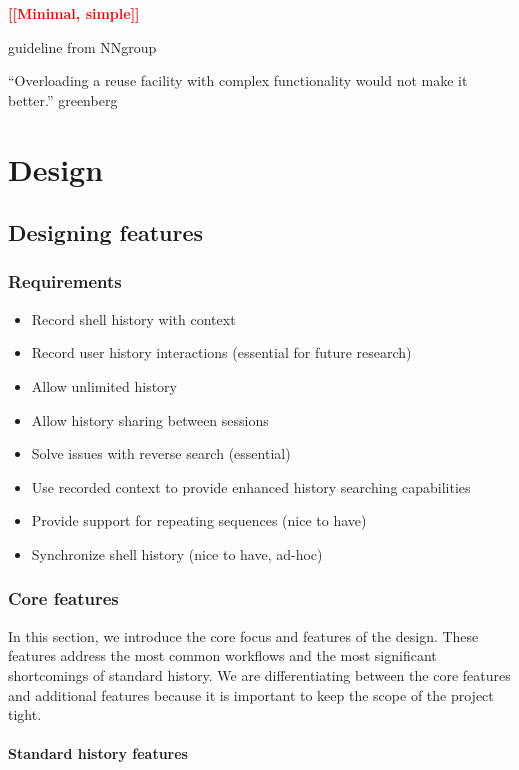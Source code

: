\documentclass[thesis=M,english]{FITthesis}[2012/10/20]
\newcommand{\todotext}[1]{\textcolor{red}{\textbf{[[#1]]}}}
\begin{document}
\todotext{Minimal, simple}

guideline from NNgroup

“Overloading a reuse facility with complex functionality would not make it better.” greenberg


\chapter{Design}

\section{Designing features}

\subsection{Requirements}

\begin{itemize}
    \item Record shell history with context
    \item Record user history interactions (essential for future research)
    \item Allow unlimited history
    \item Allow history sharing between sessions
    \item Solve issues with reverse search (essential)
    \item Use recorded context to provide enhanced history searching capabilities
    \item Provide support for repeating sequences (nice to have)
    \item Synchronize shell history (nice to have, ad-hoc)
\end{itemize}


\subsection{Core features}

In this section, we introduce the core focus and features of the design. 
These features address the most common workflows and the most significant shortcomings of standard history.
We are differentiating between the core features and additional features because it is important to keep the scope of the project tight.%

\subsubsection{Standard history features}
\end{document}
